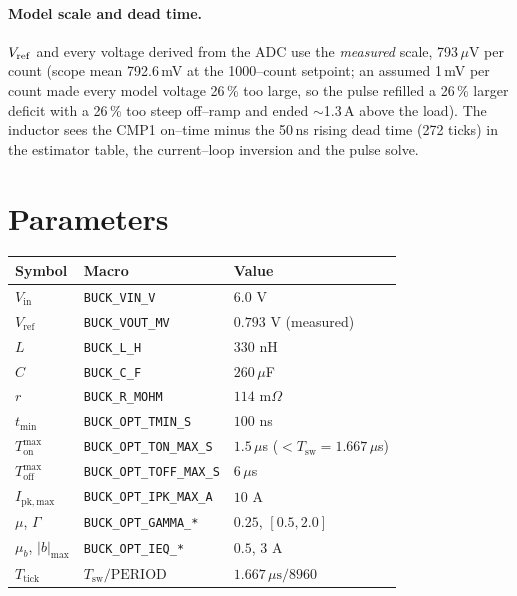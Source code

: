 \documentclass[11pt]{article}
\newcommand{\Ton}{T_{\mathrm{on}}}
\newcommand{\Toff}{T_{\mathrm{off}}}
\newcommand{\Vin}{V_{\mathrm{in}}}
\newcommand{\Vref}{V_{\mathrm{ref}}}
\newcommand{\Ipk}{I_{\mathrm{pk,max}}}
\newcommand{\Tsw}{T_{\mathrm{sw}}}
\begin{document}
\paragraph{Model scale and dead time.} $V_{\rm ref}$ and every voltage derived
from the ADC use the \emph{measured} scale, 793\,$\mu$V per count (scope mean
792.6\,mV at the 1000--count setpoint; an assumed 1\,mV per count made every
model voltage 26\,\% too large, so the pulse refilled a 26\,\% larger deficit
with a 26\,\% too steep off--ramp and ended $\sim$1.3\,A above the load). The
inductor sees the CMP1 on--time minus the 50\,ns rising dead time (272 ticks) in
the estimator table, the current--loop inversion and the pulse solve.

\section{Parameters}
\begin{center}
\begin{tabular}{@{}lll@{}}
\toprule
Symbol & Macro & Value \\
\midrule
$\Vin$ & \texttt{BUCK\_VIN\_V} & $6.0$ V\\
$\Vref$ & \texttt{BUCK\_VOUT\_MV} & $0.793$ V (measured)\\
$L$ & \texttt{BUCK\_L\_H} & $330$ nH\\
$C$ & \texttt{BUCK\_C\_F} & $260\,\mu$F\\
$r$ & \texttt{BUCK\_R\_MOHM} & $114$ m$\Omega$\\
$t_{\min}$ & \texttt{BUCK\_OPT\_TMIN\_S} & $100$ ns\\
$\Ton^{\max}$ & \texttt{BUCK\_OPT\_TON\_MAX\_S} & $1.5\,\mu$s ($<\Tsw=1.667\,\mu$s)\\
$\Toff^{\max}$ & \texttt{BUCK\_OPT\_TOFF\_MAX\_S} & $6\,\mu$s\\
$\Ipk$ & \texttt{BUCK\_OPT\_IPK\_MAX\_A} & $10$ A\\
$\mu$, $\Gamma$ & \texttt{BUCK\_OPT\_GAMMA\_*} & $0.25$, $[0.5,2.0]$\\
$\mu_b$, $|b|_{\max}$ & \texttt{BUCK\_OPT\_IEQ\_*} & $0.5$, $3$ A\\
$T_{\mathrm{tick}}$ & $\Tsw/\text{PERIOD}$ & $1.667\,\mu\text{s}/8960$\\
\bottomrule
\end{tabular}
\end{center}
\end{document}
